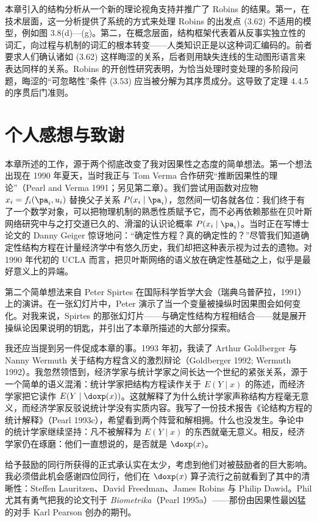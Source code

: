本章引入的结构分析从一个新的理论视角支持并推广了 Robins 的结果。第一，在技术层面，这一分析提供了系统的方式来处理 Robins 的出发点 \textup{(3.62)} 不适用的模型，例如图 3.8(d)—(g)。第二，在概念层面，结构框架代表着从反事实独立性的词汇，向过程与机制的词汇的根本转变——人类知识正是以这种词汇编码的。前者要求人们确认诸如 \textup{(3.62)} 这样晦涩的关系，后者则用缺失连线的生动图形语言来表达同样的关系。Robins 的开创性研究表明，为恰当处理时变处理的多阶段问题，晦涩的“可忽略性”条件 \textup{(3.53)} 应当被分解为其序贯成分。这导致了定理 4.4.5 的序贯后门准则。

\section*{个人感想与致谢}

本章所述的工作，源于两个彻底改变了我对因果性之态度的简单想法。第一个想法出现在 1990 年夏天，当时我正与 Tom Verma 合作研究“推断因果性的理论”（Pearl and Verma 1991；另见第二章）。我们尝试用函数对应物 $x_i=f_i(\pa_i,u_i)$ 替换父子关系 $P(x_i\mid\pa_i)$，忽然间一切各就各位：我们终于有了一个数学对象，可以把物理机制的熟悉性质赋予它，而不必再依赖那些在贝叶斯网络研究中与之打交道已久的、滑溜的认识论概率 $P(x_i\mid\pa_i)$。当时正在写博士论文的 Danny Geiger 惊讶地问：“确定性方程？真的确定性的？”尽管我们知道确定性结构方程在计量经济学中有悠久历史，我们却把这种表示视为过去的遗物。对 1990 年代初的 UCLA 而言，把贝叶斯网络的语义放在确定性基础之上，似乎是最好意义上的异端。

第二个简单想法来自 Peter Spirtes 在国际科学哲学大会（瑞典乌普萨拉，1991）上的演讲。在一张幻灯片中，Peter 演示了当一个变量被操纵时因果图会如何变化。对我来说，Spirtes 的那张幻灯片——与确定性结构方程相结合——就是展开操纵论因果说明的钥匙，并引出了本章所描述的大部分探索。

我还应当提到另一件促成本章的事。1993 年初，我读了 Arthur Goldberger 与 Nanny Wermuth 关于结构方程含义的激烈辩论（Goldberger 1992; Wermuth 1992）。我忽然领悟到，经济学家与统计学家之间长达一个世纪的紧张关系，源于一个简单的语义混淆：统计学家把结构方程读作关于 $E(Y\mid x)$ 的陈述，而经济学家把它读作 $E(Y\mid\doxp(x))$。这就解释了为什么统计学家声称结构方程毫无意义，而经济学家反驳说统计学没有实质内容。我写了一份技术报告《论结构方程的统计解释》（Pearl 1993c），希望看到两个阵营和解相拥。什么也没发生。争论中的统计学家继续坚持：凡不被解释为 $E(Y\mid x)$ 的东西就毫无意义。相反，经济学家仍在琢磨：他们一直想说的，是否就是 $\doxp(x)$。

给予鼓励的同行所获得的正式承认实在太少，考虑到他们对被鼓励者的巨大影响。我必须借此机会感谢四位同行，他们在 $\doxp(x)$ 算子流行之前就看到了其中的清晰性：Steffen Lauritzen、David Freedman、James Robins 与 Philip Dawid。Phil 尤其有勇气把我的论文刊于 \textit{Biometrika}（Pearl 1995a）——那份由因果性最凶猛的对手 Karl Pearson 创办的期刊。

